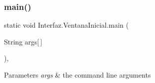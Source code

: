 \subsubsection{\texorpdfstring{main()}{main()}}
{\footnotesize\ttfamily static void Interfaz.\+Ventana\+Inicial.\+main (\begin{DoxyParamCaption}\item[{String}]{args\mbox{[}$\,$\mbox{]} }\end{DoxyParamCaption})\hspace{0.3cm}{\ttfamily [inline]}, {\ttfamily [static]}}


\begin{DoxyParams}{Parameters}
{\em args} & the command line arguments \\
\hline
\end{DoxyParams}

